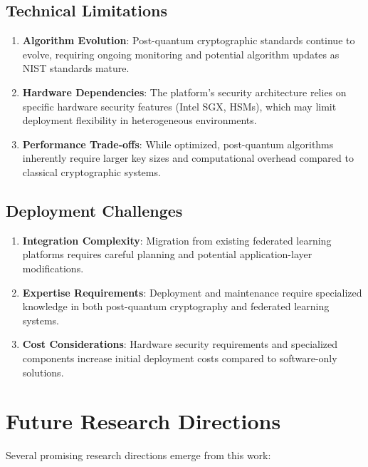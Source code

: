 \documentclass[12pt,a4paper,twoside]{book}
\begin{document}
\subsection{Technical Limitations}

\begin{enumerate}
\item \textbf{Algorithm Evolution}: Post-quantum cryptographic standards continue to evolve, requiring ongoing monitoring and potential algorithm updates as NIST standards mature.

\item \textbf{Hardware Dependencies}: The platform's security architecture relies on specific hardware security features (Intel SGX, HSMs), which may limit deployment flexibility in heterogeneous environments.

\item \textbf{Performance Trade-offs}: While optimized, post-quantum algorithms inherently require larger key sizes and computational overhead compared to classical cryptographic systems.
\end{enumerate}

\subsection{Deployment Challenges}

\begin{enumerate}
\item \textbf{Integration Complexity}: Migration from existing federated learning platforms requires careful planning and potential application-layer modifications.

\item \textbf{Expertise Requirements}: Deployment and maintenance require specialized knowledge in both post-quantum cryptography and federated learning systems.

\item \textbf{Cost Considerations}: Hardware security requirements and specialized components increase initial deployment costs compared to software-only solutions.
\end{enumerate}

\section{Future Research Directions}
\label{sec:future-research}

Several promising research directions emerge from this work:
\end{document}
